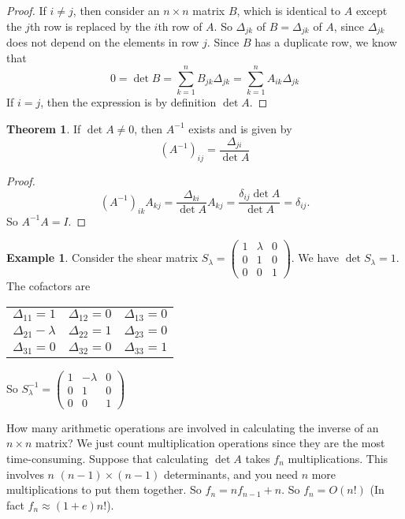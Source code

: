 \documentclass[a4paper]{article}
\theoremstyle{definition}
\newtheorem*{thm}{Theorem}
\newtheorem*{eg}{Example}
\begin{document}
\begin{proof}
  If $i \not= j$, then consider an $n\times n$ matrix $B$, which is identical to $A$ except the $j$th row is replaced by the $i$th row of $A$. So $\Delta_{jk}$ of $B = \Delta_{jk}$ of $A$, since $\Delta_{jk}$ does not depend on the elements in row $j$. Since $B$ has a duplicate row, we know that
  \[
  0 = \det B = \sum_{k = 1}^n B_{jk}\Delta_{jk} = \sum_{k = 1}^n A_{ik}\Delta_{jk}
  \]
  If $i = j$, then the expression is by definition $\det A$.
\end{proof}

\begin{thm}
  If $\det A \not =0$, then $A^{-1}$ exists and is given by
  \[
  (A^{-1})_{ij} = \frac{\Delta_{ji}}{\det A}
  \]
\end{thm}

\begin{proof}
  \[
  (A^{-1})_{ik}A_{kj} = \frac{\Delta_{ki}}{\det A} A_{kj} = \frac{\delta_{ij}\det A}{\det A} = \delta_{ij}.
  \]
  So $A^{-1}A = I$.
\end{proof}

\begin{eg}
  Consider the shear matrix $S_\lambda = \begin{pmatrix} 1 & \lambda & 0 \\ 0 & 1 & 0\\ 0 & 0 & 1\end{pmatrix}$. We have $\det{S_\lambda} = 1$. The cofactors are\\
    \begin{tabular}{ccc}
      $\Delta_{11} = 1$       & $\Delta_{12} = 0$ & $\Delta_{13} = 0$ \\
      $\Delta_{21} - \lambda$ & $\Delta_{22} = 1$ & $\Delta_{23} = 0$ \\
      $\Delta_{31} = 0$       & $\Delta_{32} = 0$ & $\Delta_{33} = 1$
    \end{tabular}

    So $S_\lambda^{-1} = \begin{pmatrix} 1 & -\lambda & 0\\ 0 & 1 & 0\\ 0 & 0 & 1\end{pmatrix}$
\end{eg}

How many arithmetic operations are involved in calculating the inverse of an $n\times n$ matrix? We just count multiplication operations since they are the most time-consuming. Suppose that calculating $\det A$ takes $f_n$ multiplications. This involves $n$ $(n - 1)\times (n - 1)$ determinants, and you need $n$ more multiplications to put them together. So $f_n = nf_{n -1} + n$. So $f_n = O(n!)$ (In fact $f_n \approx (1 + e)n!$).
\end{document}

